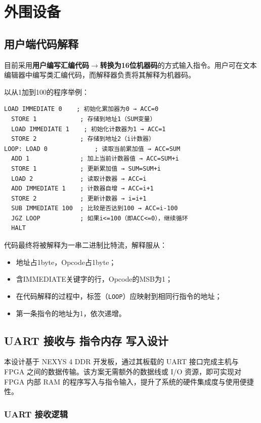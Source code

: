 \documentclass[lang=cn,a4paper,newtx]{elegantpaper}
\begin{document}
\section{外围设备}
\subsection{用户端代码解释}\label{sec:UserCode}
目前采用\textbf{用户编写汇编代码}$\to$\textbf{转换为16位机器码}的方式输入指令。用户可在文本编辑器中编写类汇编代码，而解释器负责将其解释为机器码。

以从1加到100的程序举例：
\begin{lstlisting}[language=Assembly]
  LOAD IMMEDIATE 0    ; 初始化累加器为0 → ACC=0
  STORE 1            ; 存储到地址1（SUM变量）
  LOAD IMMEDIATE 1    ; 初始化计数器为1 → ACC=1
  STORE 2            ; 存储到地址2（i计数器）
LOOP: LOAD 0             ; 读取当前累加值 → ACC=SUM
  ADD 1              ; 加上当前计数器值 → ACC=SUM+i
  STORE 1            ; 更新累加值 → SUM=SUM+i
  LOAD 2             ; 读取计数器 → ACC=i
  ADD IMMEDIATE 1    ; 计数器自增 → ACC=i+1
  STORE 2            ; 更新计数器 → i=i+1
  SUB IMMEDIATE 100  ; 比较是否达到100 → ACC=i-100
  JGZ LOOP           ; 如果i<=100（即ACC<=0），继续循环
  HALT
\end{lstlisting}

代码最终将被解释为一串二进制比特流，解释服从：
\begin{itemize}
  \item 地址占1byte，Opcode占1byte；
  \item 含IMMEDIATE关键字的行，Opcode的MSB为1；
  \item 在代码解释的过程中，标签（\texttt{LOOP}）应映射到相同行指令的地址；
  \item 第一条指令的地址为1，依次递增。
\end{itemize}



\subsection{UART 接收与 指令内存 写入设计}

本设计基于 NEXYS 4 DDR 开发板，通过其板载的 UART 接口完成主机与 FPGA 之间的数据传输。该方案无需额外的数据线或 I/O 资源，即可实现对 FPGA 内部 RAM 的程序写入与指令输入，提升了系统的硬件集成度与使用便捷性。

\subsubsection{UART 接收逻辑}
\end{document}
